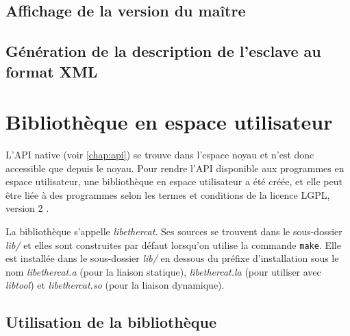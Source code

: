 \documentclass[a4paper,12pt,BCOR=6mm,bibtotoc,idxtotoc]{scrbook}
\begin{document}



\subsection{Affichage de la version du ma\^itre}




\subsection{G\'en\'eration de la description de l'esclave au format XML}




\section{Biblioth\`eque en espace utilisateur}
\label{sec:userlib}

L'API native (voir \autoref{chap:api}) se trouve dans l'espace noyau
et n'est donc accessible que depuis le noyau.
Pour rendre l'API disponible aux programmes en espace utilisateur,
une biblioth\`eque en espace utilisateur a \'et\'e cr\'e\'ee, et elle
peut \^etre li\'ee \`a des programmes selon les termes et conditions
de la licence LGPL, version 2 \cite{lgpl}.

La biblioth\`eque s'appelle \textit{libethercat}.  Ses sources se
trouvent dans le sous-dossier \textit{lib/} et elles sont construites
par d\'efaut lorsqu'on utilise la commande \lstinline+make+. Elle est
install\'ee dans le sous-dossier \textit{lib/} en dessous du pr\'efixe
d'installation sous le nom \textit{libethercat.a} (pour la liaison
statique), \textit{libethercat.la} (pour utiliser avec
\textit{libtool}) et \textit{libethercat.so} (pour la liaison
dynamique).

\subsection{Utilisation de la biblioth\`eque}
\end{document}
